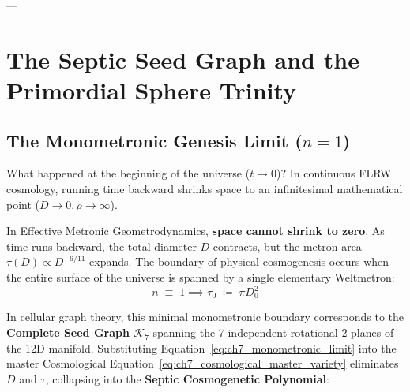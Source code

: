 \documentclass[
    12pt,
    a4paper,
    headings=normal,
    twoside=false,
    open=any,
    parskip=half
]{scrbook}
\begin{document}
---

\section{The Septic Seed Graph and the Primordial Sphere Trinity}
\label{sec:ch7_sphere_trinity}

\subsection{The Monometronic Genesis Limit ($n = 1$)}

What happened at the beginning of the universe ($t \to 0$)? In continuous FLRW cosmology, running time backward shrinks space to an infinitesimal mathematical point ($D \to 0, \rho \to \infty$). 

In Effective Metronic Geometrodynamics, \textbf{space cannot shrink to zero}. As time runs backward, the total diameter $D$ contracts, but the metron area $\tau(D) \propto D^{-6/11}$ expands. The boundary of physical cosmogenesis occurs when the entire surface of the universe is spanned by a single elementary Weltmetron:
\begin{equation}
\boxed{n \;\equiv\; 1 \implies \tau_0 \;\coloneqq\; \pi D_0^2}
\label{eq:ch7_monometronic_limit}
\end{equation}

In cellular graph theory, this minimal monometronic boundary corresponds to the \textbf{Complete Seed Graph $\mathcal{K}_7$} spanning the 7 independent rotational 2-planes of the 12D manifold. Substituting Equation~\eqref{eq:ch7_monometronic_limit} into the master Cosmological Equation~\eqref{eq:ch7_cosmological_master_variety} eliminates $D$ and $\tau$, collapsing into the \textbf{Septic Cosmogenetic Polynomial}:
\end{document}
